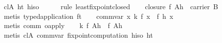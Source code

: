 \begin{isabellebody}
\ cl{}A\ ht\ hiso\isanewline
\ \ \ \ \isamarkupfalse%
\ {}rule\ least{}fixpoint{}closed{}\isanewline
\isanewline
\ \ \isamarkupfalse%
\ closure{}{}\ {}f\ {}{}\isactrlbsub A\isactrlesub h{}\ {}\ carrier\ B{}\isanewline
\ \ \ \ \isamarkupfalse%
\ {}metis\ typed{}application\ ft{}\isanewline
\isanewline
\ \ \isamarkupfalse%
\ comm{}var{}\ {}{}x{}\ k\ {}f\ x{}\ {}\ f\ {}h\ x{}{}\isanewline
\ \ \ \ \isamarkupfalse%
\ {}metis\ comm\ o{}apply{}\isanewline
\isanewline
\ \ \isamarkupfalse%
\ {}k\ {}f\ {}{}\isactrlbsub A\isactrlesub h{}{}\ {}\ f\ {}{}\isactrlbsub A\isactrlesub h{}{}\isanewline
\ \ \ \ \isamarkupfalse%
\ {}metis\ cl{}A\ comm{}var\ fixpoint{}computation\ hiso\ ht{}\isanewline
\isanewline
\ \ \isamarkupfalse%

\end{isabellebody}
